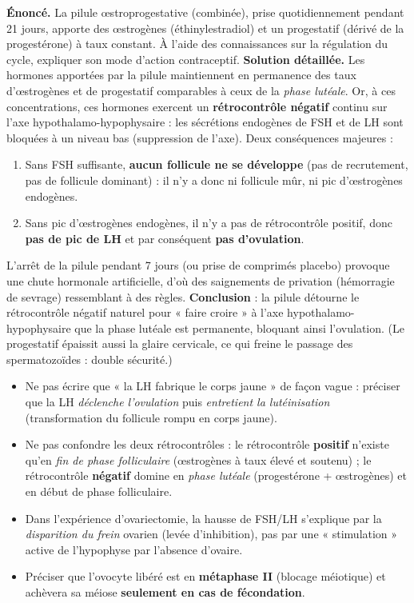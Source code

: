\documentclass[11pt]{article}
\begin{document}
\begin{exoresolu}
\textbf{Énoncé.} La pilule œstroprogestative (combinée), prise quotidiennement pendant 21 jours, apporte des œstrogènes (éthinylestradiol) et un progestatif (dérivé de la progestérone) à taux constant. À l'aide des connaissances sur la régulation du cycle, expliquer son mode d'action contraceptif.
\tcblower
\textbf{Solution détaillée.} Les hormones apportées par la pilule maintiennent en permanence des taux d'œstrogènes et de progestatif comparables à ceux de la \emph{phase lutéale}. Or, à ces concentrations, ces hormones exercent un \textbf{rétrocontrôle négatif} continu sur l'axe hypothalamo-hypophysaire : les sécrétions endogènes de FSH et de LH sont bloquées à un niveau bas (suppression de l'axe). Deux conséquences majeures :
\begin{enumerate}
  \item Sans FSH suffisante, \textbf{aucun follicule ne se développe} (pas de recrutement, pas de follicule dominant) : il n'y a donc ni follicule mûr, ni pic d'œstrogènes endogènes.
  \item Sans pic d'œstrogènes endogènes, il n'y a pas de rétrocontrôle positif, donc \textbf{pas de pic de LH} et par conséquent \textbf{pas d'ovulation}.
\end{enumerate}
L'arrêt de la pilule pendant 7 jours (ou prise de comprimés placebo) provoque une chute hormonale artificielle, d'où des saignements de privation (hémorragie de sevrage) ressemblant à des règles. \textbf{Conclusion} : la pilule détourne le rétrocontrôle négatif naturel pour « faire croire » à l'axe hypothalamo-hypophysaire que la phase lutéale est permanente, bloquant ainsi l'ovulation. (Le progestatif épaissit aussi la glaire cervicale, ce qui freine le passage des spermatozoïdes : double sécurité.)
\end{exoresolu}

\begin{attention}
\begin{itemize}
  \item Ne pas écrire que « la LH fabrique le corps jaune » de façon vague : préciser que la LH \emph{déclenche l'ovulation} puis \emph{entretient la lutéinisation} (transformation du follicule rompu en corps jaune).
  \item Ne pas confondre les deux rétrocontrôles : le rétrocontrôle \textbf{positif} n'existe qu'en \emph{fin de phase folliculaire} (œstrogènes à taux élevé et soutenu) ; le rétrocontrôle \textbf{négatif} domine en \emph{phase lutéale} (progestérone + œstrogènes) et en début de phase folliculaire.
  \item Dans l'expérience d'ovariectomie, la hausse de FSH/LH s'explique par la \emph{disparition du frein} ovarien (levée d'inhibition), pas par une « stimulation » active de l'hypophyse par l'absence d'ovaire.
  \item Préciser que l'ovocyte libéré est en \textbf{métaphase II} (blocage méiotique) et achèvera sa méiose \textbf{seulement en cas de fécondation}.
\end{itemize}
\end{attention}
\end{document}

